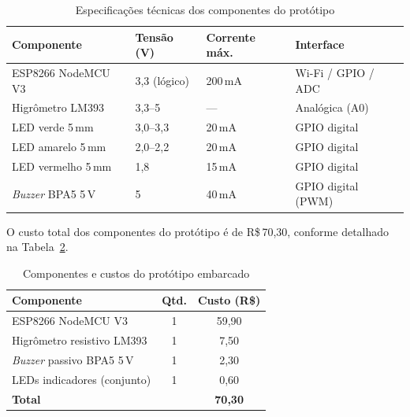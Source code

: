 \begin{table}[htb]
\centering
\caption{Especificações técnicas dos componentes do protótipo}
\label{tab:specs}
\begin{tabular}{llll}
\hline
\textbf{Componente}      & \textbf{Tensão (V)} & \textbf{Corrente máx.} & \textbf{Interface} \\
\hline
ESP8266 NodeMCU V3       & 3,3 (lógico)        & 200\,mA                & Wi-Fi / GPIO / ADC \\
Higrômetro LM393         & 3,3–5               & —                      & Analógica (A0)     \\
LED verde 5\,mm          & 3,0–3,3             & 20\,mA                 & GPIO digital       \\
LED amarelo 5\,mm        & 2,0–2,2             & 20\,mA                 & GPIO digital       \\
LED vermelho 5\,mm       & 1,8                 & 15\,mA                 & GPIO digital       \\
\textit{Buzzer} BPA5 5\,V & 5                  & 40\,mA                 & GPIO digital (PWM) \\
\hline
\end{tabular}
\end{table}

O custo total dos componentes do protótipo é de R\$\,70,30, conforme
detalhado na Tabela~\ref{tab:custos}.

\begin{table}[htb]
\centering
\caption{Componentes e custos do protótipo embarcado}
\label{tab:custos}
\begin{tabular}{lcc}
\hline
\textbf{Componente}              & \textbf{Qtd.} & \textbf{Custo (R\$)} \\
\hline
ESP8266 NodeMCU V3               & 1             & 59,90                \\
Higrômetro resistivo LM393       & 1             & 7,50                 \\
\textit{Buzzer} passivo BPA5 5\,V & 1            & 2,30                 \\
LEDs indicadores (conjunto)      & 1             & 0,60                 \\
\hline
\textbf{Total}                   &               & \textbf{70,30}       \\
\hline
\end{tabular}
\end{table}

